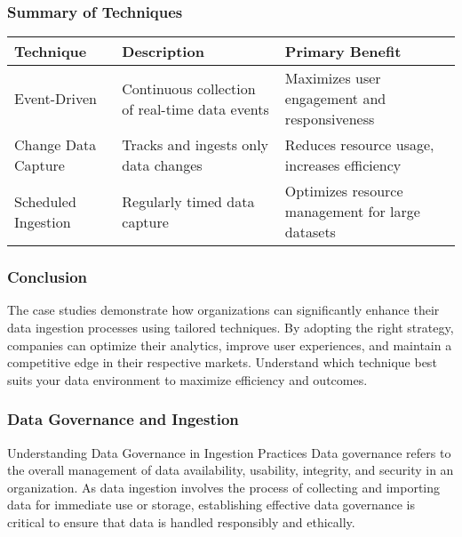 \documentclass{beamer}
\begin{document}
\begin{frame}[fragile]
    \frametitle{Summary of Techniques}
    \begin{tabular}{|l|l|l|}
        \hline
        \textbf{Technique} & \textbf{Description} & \textbf{Primary Benefit} \\ \hline
        Event-Driven & Continuous collection of real-time data events & Maximizes user engagement and responsiveness \\ \hline
        Change Data Capture & Tracks and ingests only data changes & Reduces resource usage, increases efficiency \\ \hline
        Scheduled Ingestion & Regularly timed data capture & Optimizes resource management for large datasets \\ \hline
    \end{tabular}
\end{frame}

\begin{frame}[fragile]
    \frametitle{Conclusion}
    The case studies demonstrate how organizations can significantly enhance their data ingestion processes using tailored techniques.  
    By adopting the right strategy, companies can optimize their analytics, improve user experiences, and maintain a competitive edge in their respective markets.  
    Understand which technique best suits your data environment to maximize efficiency and outcomes.
\end{frame}

\begin{frame}[fragile]
    \frametitle{Data Governance and Ingestion}
    \begin{block}{Understanding Data Governance in Ingestion Practices}
        Data governance refers to the overall management of data availability, usability, integrity, and security in an organization. As data ingestion involves the process of collecting and importing data for immediate use or storage, establishing effective data governance is critical to ensure that data is handled responsibly and ethically.
    \end{block}
\end{frame}
\end{document}

